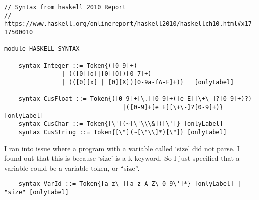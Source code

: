 \begin{lstlisting}
// Syntax from haskell 2010 Report
// https://www.haskell.org/onlinereport/haskell2010/haskellch10.html#x17-17500010

module HASKELL-SYNTAX

    syntax Integer ::= Token{([0-9]+)
                | (([0][o]|[0][O])[0-7]+) 
                | (([0][x] | [0][X])[0-9a-fA-F]+)}   [onlyLabel]

    syntax CusFloat ::= Token{([0-9]+[\.][0-9]+([e E][\+\-]?[0-9]+)?)
                                 |([0-9]+[e E][\+\-]?[0-9]+)} [onlyLabel]
    syntax CusChar ::= Token{[\'](~[\'\\\&])[\']} [onlyLabel]
    syntax CusString ::= Token{[\"](~[\"\\]*)[\"]} [onlyLabel]
\end{lstlisting}
I ran into issue where a program with a variable called ‘size’ did not parse. I found out that this is because ‘size’ is a k keyword. So I just specified that a variable could be a variable token, or “size”.
\begin{lstlisting}
    syntax VarId ::= Token{[a-z\_][a-z A-Z\_0-9\']*} [onlyLabel] | "size" [onlyLabel]
\end{lstlisting}
